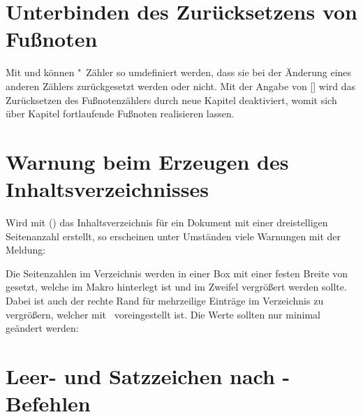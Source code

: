 \section{%
  Unterbinden des Zurücksetzens von Fußnoten%
}

Mit  und  können 
"~Zähler so umdefiniert werden, dass sie bei der Änderung eines 
anderen Zählers zurückgesetzt werden oder nicht. Mit der Angabe von 
[] wird das 
Zurücksetzen des Fußnotenzählers durch neue Kapitel deaktiviert, womit sich 
über Kapitel fortlaufende Fußnoten realisieren lassen.



\section{%
  Warnung beim Erzeugen des Inhaltsverzeichnisses%
}

%
Wird mit () das Inhaltsverzeichnis 
für ein Dokument mit einer dreistelligen Seitenanzahl erstellt, so erscheinen 
unter Umständen viele Warnungen mit der Meldung:
%
\begin{quoting}
\end{quoting}
%
Die Seitenzahlen im Verzeichnis werden in einer Box mit einer festen Breite 
von~\PValue{1.55em} gesetzt, welche im Makro  hinterlegt ist 
und im Zweifel vergrößert werden sollte. Dabei ist auch der rechte Rand für 
%
mehrzeilige Einträge im Verzeichnis  zu vergrößern, welcher 
mit~\PValue{2.55em} voreingestellt ist. Die Werte sollten nur minimal geändert 
werden:
%
\begin{quoting}
\begin{Code}
\makeatletter
\renewcommand*{\@pnumwidth}{1.7em}\renewcommand*{\@tocrmarg}{2.7em}
\makeatother
\end{Code}
\end{quoting}



\section{%
  Leer- und Satzzeichen nach -Befehlen%
  \label{sec:tips:xspace}%
}

